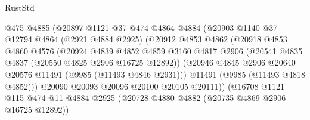 \begin{lexlean}{RustStd}
\begin{coremodule}
                                  @475
                                  @4885
                                  (@20897
                                    @1121
                                    @37
                                    @474
                                    @4864
                                    @4884
                                    (@20903
                                      @1140
                                      @37
                                      @12794
                                      @4864
                                      (@2921 @4884 @2925)
                                      (@20912
                                        @4853
                                        @4862
                                        (@20918
                                          @4853
                                          @4860
                                          @4576
                                          (@20924
                                            @4839
                                            @4852
                                            @4859
                                            @3160
                                            @4817
                                            @2906
                                            (@20541 @4835 @4837 (@20550 @4825 @2906 @16725 @12892))
                                            (@20946
                                              @4845
                                              @2906
                                              @20640
                                              @20576
                                              @11491
                                              (@9985 (@11493 @4846 @2931)))
                                            @11491
                                            (@9985 (@11493 @4818 @4852)))
                                          @20090
                                          @20093
                                          @20096
                                          @20100
                                          @20105
                                          @20111))
                                      (@16708
                                        @1121
                                        @115
                                        @474
                                        @11
                                        @4884
                                        @2925
                                        (@20728 @4880 @4882 (@20735 @4869 @2906 @16725 @12892))

\end{coremodule}
\end{lexlean}
